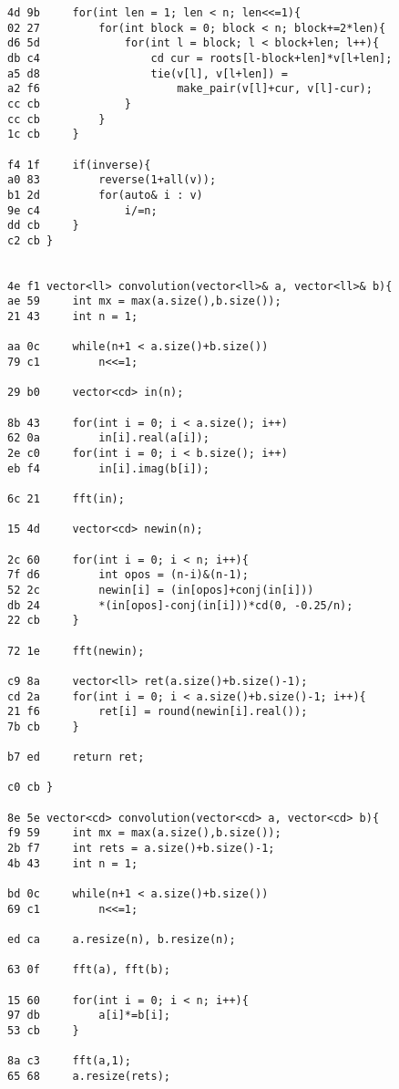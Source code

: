\documentclass[11pt, a4paper, twoside]{article}
\begin{document}
\begin{lstlisting}
4d 9b     for(int len = 1; len < n; len<<=1){
02 27         for(int block = 0; block < n; block+=2*len){
d6 5d             for(int l = block; l < block+len; l++){
db c4                 cd cur = roots[l-block+len]*v[l+len];
a5 d8                 tie(v[l], v[l+len]) =
a2 f6                     make_pair(v[l]+cur, v[l]-cur);
cc cb             }
cc cb         }
1c cb     }
      
f4 1f     if(inverse){
a0 83         reverse(1+all(v));
b1 2d         for(auto& i : v)
9e c4             i/=n;
dd cb     }
c2 cb }


4e f1 vector<ll> convolution(vector<ll>& a, vector<ll>& b){
ae 59     int mx = max(a.size(),b.size());
21 43     int n = 1;
      
aa 0c     while(n+1 < a.size()+b.size())
79 c1         n<<=1;
      
29 b0     vector<cd> in(n);
      
8b 43     for(int i = 0; i < a.size(); i++)
62 0a         in[i].real(a[i]);
2e c0     for(int i = 0; i < b.size(); i++)
eb f4         in[i].imag(b[i]);
      
6c 21     fft(in);
      
15 4d     vector<cd> newin(n);
      
2c 60     for(int i = 0; i < n; i++){
7f d6         int opos = (n-i)&(n-1);
52 2c         newin[i] = (in[opos]+conj(in[i]))
db 24         *(in[opos]-conj(in[i]))*cd(0, -0.25/n);
22 cb     }
          
72 1e     fft(newin);
      
c9 8a     vector<ll> ret(a.size()+b.size()-1);
cd 2a     for(int i = 0; i < a.size()+b.size()-1; i++){
21 f6         ret[i] = round(newin[i].real());
7b cb     }
      
b7 ed     return ret;
      
c0 cb }

8e 5e vector<cd> convolution(vector<cd> a, vector<cd> b){
f9 59     int mx = max(a.size(),b.size());
2b f7     int rets = a.size()+b.size()-1;
4b 43     int n = 1;
       
bd 0c     while(n+1 < a.size()+b.size())
69 c1         n<<=1;
          
ed ca     a.resize(n), b.resize(n);
       
63 0f     fft(a), fft(b);
        
15 60     for(int i = 0; i < n; i++){
97 db         a[i]*=b[i];
53 cb     }
          
8a c3     fft(a,1);
65 68     a.resize(rets);
       

\end{lstlisting}
\end{document}
